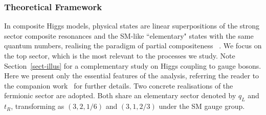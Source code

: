 \subsubsection*{Theoretical Framework}
\label{MCHM}
In composite Higgs models, physical states are linear superpositions of the strong sector composite resonances
and the SM-like ``elementary" states with the same quantum numbers, realising the paradigm of partial
compositeness ~\cite{KAPLAN1991259}.
We focus on the top sector,
which is the most relevant to the processes we study. Note Section~\ref{sect-illus} for a complementary study on Higgs coupling to gauge bosons.  Here we present only the essential features of the
 analysis, referring the reader to the companion
work~\cite{MCHMtthh} for further details. Two concrete
realisations of the fermionic sector are adopted. Both share an elementary sector denoted by $q_L$ and
$t_R$, transforming  as $(3,2,1/6)$ and $(3,1,2/3)$ under the SM gauge group.
%

